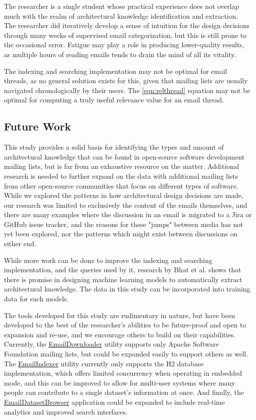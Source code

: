 \documentclass[a4paper, 12pt]{article}
\begin{document}
		The researcher is a single student whose practical experience does not overlap much with the realm of architectural knowledge identification and extraction. The researcher did iteratively develop a sense of intuition for the design decisions through many weeks of supervised email categorization, but this is still prone to the occasional error. Fatigue may play a role in producing lower-quality results, as multiple hours of reading emails tends to drain the mind of all its vitality.
		
		The indexing and searching implementation may not be optimal for email threads, as no general solution exists for this, given that mailing lists are usually navigated chronologically by their users. The \ref{eqn:relthread} equation may not be optimal for computing a truly useful relevance value for an email thread.
		
	\subsection{Future Work}
		This study provides a solid basis for identifying the types and amount of architectural knowledge that can be found in open-source software development mailing lists, but is far from an exhaustive resource on the matter. Additional research is needed to further expand on the data with additional mailing lists from other open-source communities that focus on different types of software. While we explored the patterns in how architectural design decisions are made, our research was limited to exclusively the content of the emails themselves, and there are many examples where the discussion in an email is migrated to a Jira or GitHub issue tracker, and the reasons for these "jumps" between media has not yet been explored, nor the patterns which might exist between discussions on either end.
		
		While more work can be done to improve the indexing and searching implementation, and the queries used by it, research by Bhat et al.\autocite{bhat} shows that there is promise in designing machine learning models to automatically extract architectural knowledge. The data in this study can be incorporated into training data for such models.
		
		The tools developed for this study are rudimentary in nature, but have been developed to the best of the researcher's abilities to be future-proof and open to expansion and re-use, and we encourage others to build on their capabilities. Currently, the \href{https://github.com/ArchitecturalKnowledgeAnalysis/EmailDownloader}{EmailDownloader} utility supports only Apache Software Foundation mailing lists, but could be expanded easily to support others as well. The \href{https://github.com/ArchitecturalKnowledgeAnalysis/EmailIndexer}{EmailIndexer} utility currently only supports the H2 database implementation, which offers limited concurrency when operating in embedded mode, and this can be improved to allow for multi-user systems where many people can contribute to a single dataset's information at once. And finally, the \href{https://github.com/ArchitecturalKnowledgeAnalysis/EmailDatasetBrowser}{EmailDatasetBrowser} application could be expanded to include real-time analytics and improved search interfaces.
\end{document}
